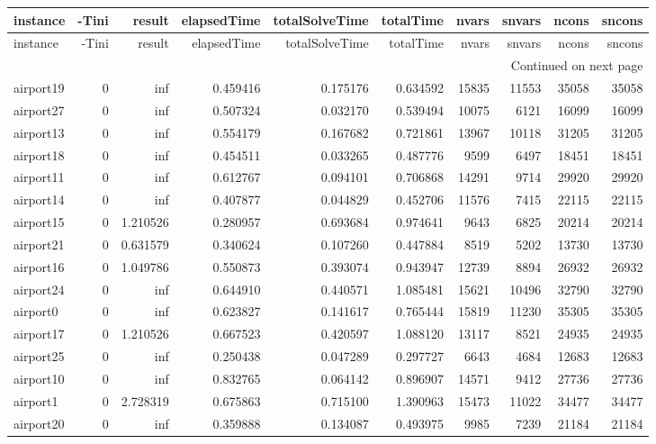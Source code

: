 \begin{longtable}{|l|r|r|r|r|r|r|r|r|r|}
\toprule
instance & -Tini & result & elapsedTime & totalSolveTime & totalTime & nvars & snvars & ncons & sncons \\
\midrule
\endfirsthead
\toprule
instance & -Tini & result & elapsedTime & totalSolveTime & totalTime & nvars & snvars & ncons & sncons \\
\midrule
\endhead
\midrule
\multicolumn{10}{r}{Continued on next page} \\
\midrule
\endfoot
\bottomrule
\endlastfoot
airport19 & 0 & inf & 0.459416 & 0.175176 & 0.634592 & 15835 & 11553 & 35058 & 35058 \\
airport27 & 0 & inf & 0.507324 & 0.032170 & 0.539494 & 10075 & 6121 & 16099 & 16099 \\
airport13 & 0 & inf & 0.554179 & 0.167682 & 0.721861 & 13967 & 10118 & 31205 & 31205 \\
airport18 & 0 & inf & 0.454511 & 0.033265 & 0.487776 & 9599 & 6497 & 18451 & 18451 \\
airport11 & 0 & inf & 0.612767 & 0.094101 & 0.706868 & 14291 & 9714 & 29920 & 29920 \\
airport14 & 0 & inf & 0.407877 & 0.044829 & 0.452706 & 11576 & 7415 & 22115 & 22115 \\
airport15 & 0 & 1.210526 & 0.280957 & 0.693684 & 0.974641 & 9643 & 6825 & 20214 & 20214 \\
airport21 & 0 & 0.631579 & 0.340624 & 0.107260 & 0.447884 & 8519 & 5202 & 13730 & 13730 \\
airport16 & 0 & 1.049786 & 0.550873 & 0.393074 & 0.943947 & 12739 & 8894 & 26932 & 26932 \\
airport24 & 0 & inf & 0.644910 & 0.440571 & 1.085481 & 15621 & 10496 & 32790 & 32790 \\
airport0 & 0 & inf & 0.623827 & 0.141617 & 0.765444 & 15819 & 11230 & 35305 & 35305 \\
airport17 & 0 & 1.210526 & 0.667523 & 0.420597 & 1.088120 & 13117 & 8521 & 24935 & 24935 \\
airport25 & 0 & inf & 0.250438 & 0.047289 & 0.297727 & 6643 & 4684 & 12683 & 12683 \\
airport10 & 0 & inf & 0.832765 & 0.064142 & 0.896907 & 14571 & 9412 & 27736 & 27736 \\
airport1 & 0 & 2.728319 & 0.675863 & 0.715100 & 1.390963 & 15473 & 11022 & 34477 & 34477 \\
airport20 & 0 & inf & 0.359888 & 0.134087 & 0.493975 & 9985 & 7239 & 21184 & 21184 \\

\end{longtable}

